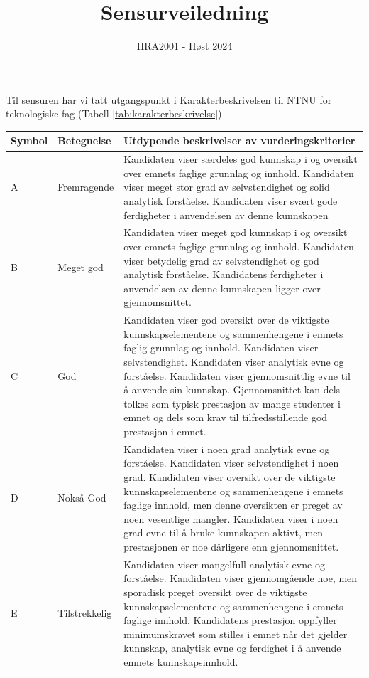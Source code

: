 \documentclass[12pt, titlepage]{article}
\begin{document}
\title{Sensurveiledning}
\author{IIRA2001 - Høst 2024}
\date{}
\maketitle

Til sensuren har vi tatt utgangspunkt i Karakterbeskrivelsen til NTNU for teknologiske fag (Tabell \ref{tab:karakterbeskrivelse})

\begin{table}[h!]
   \footnotesize
   \begin{center}
   \begin{tabular}{|l|l|p{12cm}|}
      \hline
      \textbf{Symbol}   &  \textbf{Betegnelse}  &   \textbf{Utdypende beskrivelser av vurderingskriterier} \\
      \hline
      A & Fremragende & Kandidaten viser særdeles god kunnskap i og oversikt over emnets faglige grunnlag og innhold. Kandidaten viser meget stor grad av selvstendighet og solid analytisk forståelse. Kandidaten viser svært gode ferdigheter i anvendelsen av denne kunnskapen\\
      \hline
      B & Meget god   &Kandidaten viser meget god kunnskap i og oversikt over emnets faglige grunnlag og innhold. Kandidaten viser betydelig grad av selvstendighet og god analytisk forståelse. Kandidatens ferdigheter i anvendelsen av denne kunnskapen ligger over gjennomsnittet.\\
      \hline
      C & God &Kandidaten viser god oversikt over de viktigste kunnskapselementene og sammenhengene i emnets faglig grunnlag og innhold. Kandidaten viser selvstendighet. Kandidaten viser analytisk evne og forståelse. Kandidaten viser gjennomsnittlig evne til å anvende sin kunnskap. Gjennomsnittet kan dels tolkes som typisk prestasjon av mange studenter i emnet og dels som krav til tilfredsstillende god prestasjon i emnet.\\
      \hline
      D & Nokså God &Kandidaten viser i noen grad analytisk evne og forståelse. Kandidaten viser selvstendighet i noen grad. Kandidaten viser oversikt over de viktigste kunnskapselementene og sammenhengene i emnets faglige innhold, men denne oversikten er preget av noen vesentlige mangler. Kandidaten viser i noen grad evne til å bruke kunnskapen aktivt, men prestasjonen er noe dårligere enn gjennomsnittet.\\
      \hline
      E & Tilstrekkelig & Kandidaten viser mangelfull analytisk evne og forståelse. Kandidaten viser gjennomgående noe, men sporadisk preget oversikt over de viktigste kunnskapselementene og sammenhengene i emnets faglige innhold. Kandidatens prestasjon oppfyller minimumskravet som stilles i emnet når det gjelder kunnskap, analytisk evne og ferdighet i å anvende emnets kunnskapsinnhold.\\

\end{tabular}
\end{center}
\end{table}
\end{document}
